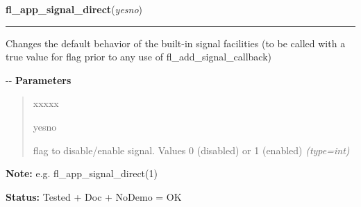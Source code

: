 \hspace{.8\funcindent}\begin{boxedminipage}{\funcwidth}

    \raggedright \textbf{fl\_app\_signal\_direct}(\textit{yesno})

    \vspace{-1.5ex}

    \rule{\textwidth}{0.5\fboxrule}
\setlength{\parskip}{2ex}

Changes the default behavior of the built-in signal facilities (to
be called with a true value for flag prior to any use of
fl\_add\_signal\_callback)

-{}-
\setlength{\parskip}{1ex}
      \textbf{Parameters}
      \vspace{-1ex}

      \begin{quote}
        \begin{Ventry}{xxxxx}

          \item[yesno]


flag to disable/enable signal. Values 0 (disabled) or 1 (enabled)
            {\it (type=int)}

        \end{Ventry}

      \end{quote}

\textbf{Note:} 
e.g. fl\_app\_signal\_direct(1)


\textbf{Status:} 
Tested + Doc + NoDemo = OK


    \end{boxedminipage}

    \label{xformslib:flbasic:fl_input_end_return_handling}

    \vspace{0.5ex}

